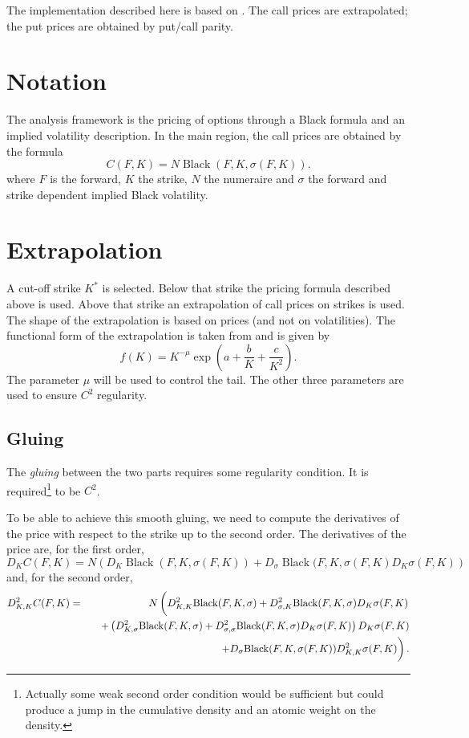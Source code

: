 \documentclass[]{amsart}
\newcommand{\black}{{\operatorname{Black}}}
\begin{document}
The implementation described here is based on \cite{BDK.2008.1}. The call prices are extrapolated; the put prices are obtained by put/call parity.

\section{Notation}

The analysis framework is the pricing of options through a Black formula and an implied volatility description. In the main region, the call prices are obtained by the formula
\begin{equation}
\label{EqnPrice}
C(F,K) = N \black(F, K, \sigma(F,K)).
\end{equation}
where $F$ is the forward, $K$ the strike, $N$ the numeraire and $\sigma$ the forward and strike dependent implied Black volatility.

\section{Extrapolation}

A cut-off strike $K^*$ is selected. Below that strike the pricing formula described above is used. Above that strike an extrapolation of call prices on strikes is used. The shape of the extrapolation is based on prices (and not on volatilities). The functional form of the extrapolation is taken from \cite{BDK.2008.1} and is given by
\begin{equation}
\label{EqnExtra}
f(K) = K^{-\mu} \exp\left( a + \frac{b}{K} + \frac{c}{K^2} \right).
\end{equation}
The parameter $\mu$ will be used to control the tail. The other three parameters are used to ensure $C^2$ regularity.
\subsection{Gluing}

The \emph{gluing} between the two parts requires some regularity condition. It is required\footnote{Actually some weak second order condition would be sufficient but could produce a jump in the cumulative density and an atomic weight on the density.} to be $C^2$. 

To be able to achieve this smooth gluing, we need to compute the derivatives of the price with respect to the strike up to the second order. The derivatives of the price are, for the first order,
\[
D_K C(F,K) = N \left( D_K \black(F, K, \sigma(F,K)) + D_\sigma \black(F, K, \sigma(F,K) D_K \sigma(F,K) \right)
\]
and, for the second order,
\begin{eqnarray*}
D^2_{K,K} C(F,K) & = & N \left(\vphantom{\int} D^2_{K,K} \black(F, K, \sigma) +D^2_{\sigma,K} \black(F, K, \sigma) D_K \sigma(F,K) \right.\\
& & \quad + \left( D^2_{K,\sigma}\black(F, K, \sigma) + D^2_{\sigma,\sigma}\black(F, K, \sigma) D_K \sigma(F,K) \right) D_K \sigma(F,K) \\
& & \quad \left. +  D_\sigma \black(F, K, \sigma(F,K)) D^2_{K,K} \sigma(F,K) \vphantom{\int}\right).
\end{eqnarray*}
\end{document}

